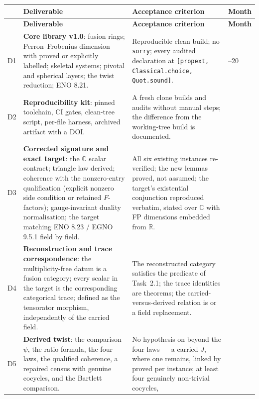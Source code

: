 \documentclass[11pt,a4paper]{article}
\theoremstyle{remark}
\newcommand{\code}[1]{\texttt{\detokenize{#1}}}
\newcommand{\R}{\mathbb{R}}
\newcommand{\Cx}{\mathbb{C}}
\begin{document}
{\small
\begin{longtable}{@{}>{\raggedright\arraybackslash}p{}>{\raggedright\arraybackslash}p{}>{\raggedright\arraybackslash}p{}>{\raggedright\arraybackslash}p{}@{}}
\toprule
& \textbf{Deliverable} & \textbf{Acceptance criterion} & \textbf{Month} \\
\midrule
\endfirsthead
\toprule
& \textbf{Deliverable} & \textbf{Acceptance criterion} & \textbf{Month} \\
\midrule
\endhead
\bottomrule
\endlastfoot
D1 & \textbf{Core library v1.0}: fusion rings; Perron--Frobenius dimension with \code{FPData}
proved or explicitly labelled; skeletal systems; pivotal and spherical layers; the twist
reduction; ENO 8.21. & Reproducible clean build; no \texttt{sorry}; every audited declaration at
\texttt{[propext, Classical.choice, Quot.sound]}. & 4--20 \\
D2 & \textbf{Reproducibility kit}: pinned toolchain, CI gates, clean-tree script, per-file
harness, archived artifact with a DOI. & A fresh clone builds and audits without manual steps;
the difference from the working-tree build is documented. & 4 \\
D3 & \textbf{Corrected signature and exact target}: the $\Cx$ scalar contract; triangle law
derived; coherence with the nonzero-entry qualification (explicit nonzero side condition or
retained $F$-factors); gauge-invariant duality normalisation; the target
matching ENO 8.23 / EGNO 9.5.1 field by field. & All six existing instances re-verified; the new
lemmas proved, not assumed; the target's existential conjunction reproduced verbatim, stated
over $\Cx$ with FP dimensions embedded from $\R$. & 8 \\
D4 & \textbf{Reconstruction and trace correspondence}: the multiplicity-free datum is a fusion
category; every scalar in the target is the corresponding categorical trace; \code{derivedJ}
defined as the tensorator morphism, independently of the carried field. & The reconstructed
category satisfies the \code{IsFusionCategory} predicate of Task~2.1; the trace identities
are theorems; the carried-versus-derived relation is \code{J_match} or a field replacement. & 10 \\
D5 & \textbf{Derived twist}: the comparison $\psi$, the ratio formula, the four laws, the
qualified coherence, a repaired census with genuine cocycles, and the Bartlett comparison. & No
hypothesis on \code{derivedJ} beyond the four laws --- a carried $J$, where one remains, linked
by \code{J_match} proved per instance; at least four genuinely non-trivial cocycles,

\end{longtable}}
\end{document}
